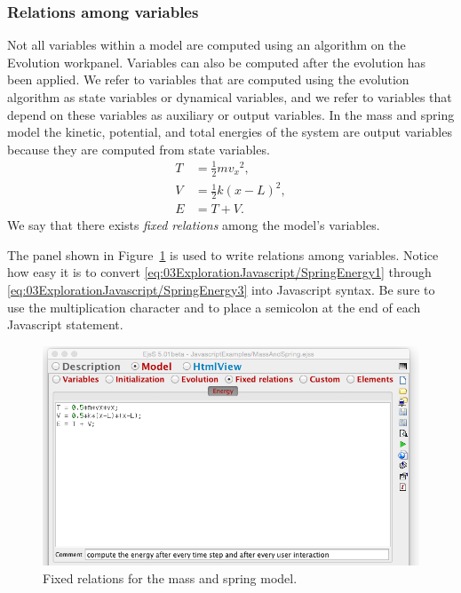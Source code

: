 \subsubsection{Relations among variables}\label{section:03ExplorationJavascriptInspectingRelations}
Not all variables within a model are computed using an algorithm on the Evolution workpanel. Variables can also be computed after the evolution has been applied. We refer to variables that are computed using the evolution algorithm as state variables or dynamical variables, and we refer to variables that depend on these variables as auxiliary or output variables. In the mass and
spring model the kinetic, potential, and total energies of the system are output variables because they are computed
from state variables.
\begin{align}
  T &= \frac{1}{2} m {v_x}^2,     \label{eq:03ExplorationJavascript/SpringEnergy1} \\
  V &= \frac{1}{2} k (x-L)^2,     \label{eq:03ExplorationJavascript/SpringEnergy2} \\
  E &= T + V.                     \label{eq:03ExplorationJavascript/SpringEnergy3}
\end{align}
We  say that there exists \emph{fixed relations} among the model's variables.

The  panel shown in Figure~\ref{fig:03ExplorationJavascript/ModelRelations} is used to write relations among
variables. Notice how easy it is to convert \eqref{eq:03ExplorationJavascript/SpringEnergy1} through
\eqref{eq:03ExplorationJavascript/SpringEnergy3} into Javascript syntax. Be sure to
use the multiplication character \lit{*} and to place a semicolon at the end of each Javascript statement.

\begin{figure}[htb]
    \centering
  \includegraphics[scale=\scale]{03ExplorationJavascript/images/ModelConstraints.png}
    \caption{Fixed relations for the mass and spring model.}
    \label{fig:03ExplorationJavascript/ModelRelations}
\end{figure}

